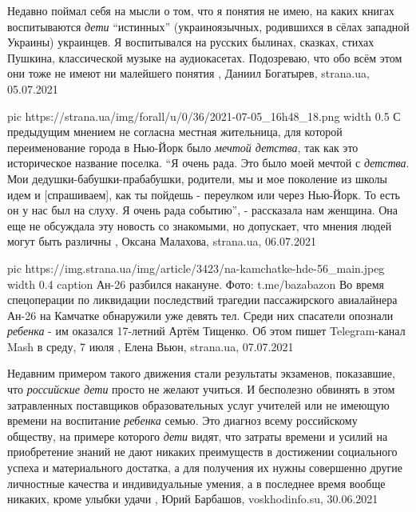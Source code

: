 Недавно поймал себя на мысли о том, что я понятия не имею, на каких книгах
воспитываются \emph{дети} \enquote{истинных} (украиноязычных, родившихся в сёлах западной
Украины) украинцев. Я воспитывался на русских былинах, сказках, стихах Пушкина,
классической музыке на аудиокасетах. Подозреваю, что обо всём этом они тоже не
имеют ни малейшего понятия
, 
Даниил Богатырев, strana.ua, 05.07.2021

\ifcmt
  pic https://strana.ua/img/forall/u/0/36/2021-07-05_16h48_18.png
	width 0.5
\fi
С предыдущим мнением не согласна местная жительница, для которой переименование
города в Нью-Йорк было \emph{мечтой детства}, так как это историческое название
поселка.  \enquote{Я очень рада. Это было моей мечтой с \emph{детства}. Мои
дедушки-бабушки-прабабушки, родители, мы и мое поколение из школы идем и
[спрашиваем], как ты пойдешь - переулком или через Нью-Йорк. То есть он у нас
был на слуху. Я очень рада событию}, - рассказала нам женщина.  Она еще не
обсуждала эту новость со знакомыми, но допускает, что мнения людей могут быть
различны
, 
Оксана Малахова, strana.ua, 06.07.2021

\ifcmt
  pic https://img.strana.ua/img/article/3423/na-kamchatke-hde-56_main.jpeg
	width 0.4
	caption Ан-26 разбился накануне. Фото: t.me/bazabazon 
\fi
Во время спецоперации по ликвидации последствий трагедии пассажирского
авиалайнера Ан-26 на Камчатке обнаружили уже девять тел. Среди них спасатели
опознали \emph{ребенка} - им оказался 17-летний Артём Тищенко.  Об этом пишет
Telegram-канал Mash в среду, 7 июля
, 
Елена Вьюн, strana.ua, 07.07.2021

Недавним примером такого движения стали результаты экзаменов, показавшие, что
\emph{российские дети} просто не желают учиться. И бесполезно обвинять в этом
затравленных поставщиков образовательных услуг учителей или не имеющую времени
на воспитание \emph{ребенка} семью. Это диагноз всему российскому обществу, на примере
которого \emph{дети} видят, что затраты времени и усилий на приобретение знаний не
дают никаких преимуществ в достижении социального успеха и материального
достатка, а для получения их нужны совершенно другие личностные качества и
индивидуальные умения, а в последнее время вообще никаких, кроме улыбки удачи
, 
Юрий Барбашов, voskhodinfo.su, 30.06.2021

